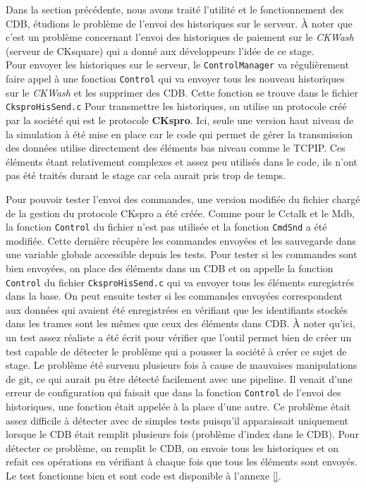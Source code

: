 \documentclass[a4paper]{article}
\begin{document}
Dans la section précédente, nous avons traité l'utilité et le fonctionnement des
CDB, étudions le problème de l'envoi des historiques sur le serveur. À noter que
c'est un problème  concernant l'envoi des historiques de paiement sur le
\textit{CKWash} (serveur de CKsquare) qui a donné aux développeurs l'idée de ce
stage.\\

Pour envoyer les historiques sur le serveur, le \verb|ControlManager| va
régulièrement faire appel à une fonction \verb|Control| qui va envoyer tous les
nouveau historiques sur le \textit{CKWash} et les supprimer des CDB. Cette
fonction se trouve dans le fichier \verb|CksproHisSend.c| Pour transmettre les
historiques, on utilise un protocole créé par la société qui est le protocole
\textbf{CKspro}. Ici, seule une version haut niveau de la simulation à été mise
en place car le code qui permet de gérer la transmission des données utilise
directement des éléments bas niveau comme le TCPIP. Ces éléments étant
relativement complexes et assez peu utilisés dans le code, ils n'ont pas été
traités durant le stage car cela aurait pris trop de temps.

Pour pouvoir tester l'envoi des commandes, une version modifiée du fichier
chargé de la gestion du protocole CKspro a été créée. Comme pour le Cctalk et le
Mdb, la fonction \verb|Control| du fichier n'est pas utilisée et la fonction
\verb|CmdSnd| a été modifiée. Cette dernière récupère les commandes envoyées et
les sauvegarde dans une variable globale accessible depuis les tests. Pour
tester si les commandes sont bien envoyées, on place des éléments dans un CDB et
on appelle la fonction \verb|Control| du fichier \verb|CksproHisSend.c| qui va
envoyer tous les éléments enregistrés dans la base. On peut ensuite tester si
les commandes envoyées correspondent aux données qui avaient été enregistrées en
vérifiant que les identifiants stockés dans les trames sont les mêmes que ceux
des éléments dans CDB. À noter qu'ici, un test assez réaliste a été écrit pour
vérifier que l'outil permet bien de créer un test capable de détecter le
problème qui a pousser la société à créer ce sujet de stage. Le problème été
survenu plusieurs fois à cause de mauvaises manipulations de git, ce qui aurait
pu être détecté facilement avec une pipeline. Il venait d'une erreur de
configuration qui faisait que dans la fonction \verb|Control| de l'envoi des
historiques, une fonction était appelée à la place d'une autre. Ce problème
était assez difficile à détecter avec de simples tests puisqu'il apparaissait
uniquement lorsque le CDB était remplit plusieurs fois (problème d'index dans le
CDB). Pour détecter ce problème, on remplit le CDB, on envoie tous les
historiques et on refait ces opérations en vérifiant à chaque fois que tous les
éléments sont envoyés. Le test fonctionne bien et sont code est disponible à
l'annexe \ref{}.
\end{document}
